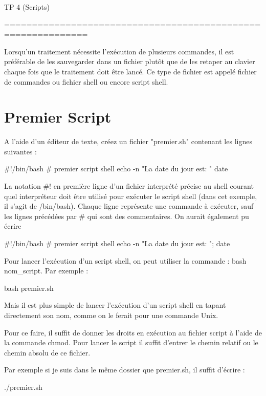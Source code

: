 \documentclass[10pt,a4paper]{article}
\begin{document}
\begin{center}
\huge{TP 4 (Scripts)}
\end{center}
=============================================================

Lorsqu’un traitement nécessite l’exécution de plusieurs commandes, il est préférable de les sauvegarder dans un fichier plutôt que de les retaper au clavier chaque fois que le traitement doit être lancé. Ce type de fichier est appelé fichier de commandes ou fichier shell ou
encore script shell.

\section{Premier Script}


A l’aide d’un éditeur de texte, créez un fichier "premier.sh" contenant les lignes suivantes :
\begin{mylisting}
#!/bin/bash
# premier script shell
echo -n "La date du jour est: " date
\end{mylisting}

La notation \#! en première ligne d'un fichier interprété précise au shell courant quel interpréteur doit être utilisé pour exécuter le script shell (dans cet exemple, il s’agit de /bin/bash). Chaque ligne représente une commande à exécuter, sauf les lignes précédées par \# qui sont des commentaires. On aurait également pu écrire
\begin{mylisting}
  #!/bin/bash
  # premier script shell
  echo -n "La date du jour est: "; date    
\end{mylisting}

Pour lancer l’exécution d’un script shell, on peut utiliser la commande : bash nom\_script.
Par exemple :
\begin{mylisting}
  bash premier.sh  
\end{mylisting}


Mais il est plus simple de lancer l’exécution d’un script shell en
tapant directement son nom, comme on le ferait pour une commande
Unix. 

Pour ce faire, il suffit de donner les droits en exécution au fichier script à l'aide de la commande chmod. Pour lancer le script il suffit d'entrer le chemin relatif ou le chemin absolu de ce fichier.

Par exemple si je suis dans le même dossier que premier.sh, il suffit d'écrire :
\begin{mylisting}
  ./premier.sh  
\end{mylisting}
\end{document}
